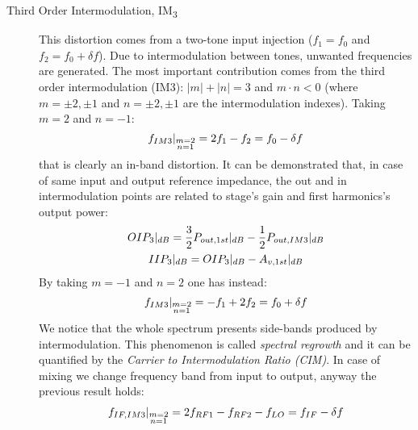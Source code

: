 \begin{description}
	\item [Third Order Intermodulation, IM\textsubscript{3}] This distortion comes from a two-tone input injection ($f_1 = f_0$ and $f_2=f_0+\delta f$). Due to intermodulation between tones, unwanted frequencies are generated. The most important contribution comes from the third order intermodulation (IM3): $|m|+|n|=3$ and $m\cdot n<0$ (where $m=\pm2,\pm1$ and $n=\pm2,\pm1$ are the intermodulation indexes). Taking $m=2$ and $n=-1$:
	\begin{equation}
		f_{IM3}|_{\substack{m=2\\n=1}} =  2f_1 - f_2 = f_0 - \delta f \notag
	\end{equation}
	that is clearly an in-band distortion.
	It can be demonstrated that, in case of same input and output reference impedance, the out and in intermodulation points are related to stage's gain and first harmonics's output power:
	\begin{gather}
	OIP_3|_{dB} = \frac{3}{2}P_{out,1st}|_{dB}-\frac{1}{2}P_{out,IM3}|_{dB} \notag \\
	IIP_3|_{dB} = OIP_3|_{dB}-A_{v,1st}|_{dB} \notag
	\end{gather} 
	By taking $m=-1$ and $n=2$ one has instead:
	\begin{equation}
	f_{IM3}|_{\substack{m=2\\n=1}} =  -f_1 +2 f_2 = f_0 + \delta f \notag
	\end{equation} 
	We notice that the whole spectrum presents side-bands produced by intermodulation. This phenomenon is called \emph{spectral regrowth} and it can be quantified by the \emph{Carrier to Intermodulation Ratio (CIM)}.
	In case of mixing we change frequency band from input to output, anyway the previous result holds:
	\begin{gather}
			f_{IF,IM3}|_{\substack{m=2\\n=1}} = 2f_{RF1} - f_{RF2} -f_{LO}= f_{IF} - \delta f \notag
	\end{gather}
\end{description}
